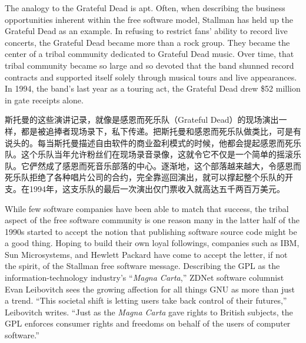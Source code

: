 \ifdefined\eng
The analogy to the Grateful Dead is apt. Often, when describing the business opportunities inherent within the free software model, Stallman has held up the Grateful Dead as an example. In refusing to restrict fans' ability to record live concerts, the Grateful Dead became more than a rock group. They became the center of a tribal community dedicated to Grateful Dead music. Over time, that tribal community became so large and so devoted that the band shunned record contracts and supported itself solely through musical tours and live appearances. In 1994, the band's last year as a touring act, the Grateful Dead drew \$52 million in gate receipts alone.
\fi

\ifdefined\chs
斯托曼的这些演讲记录，就像是感恩而死乐队（Grateful Dead）的现场演出一样，都是被追捧者现场录下，私下传递。把斯托曼和感恩而死乐队做类比，可是有说头的。每当斯托曼描述自由软件的商业盈利模式的时候，他都会提起感恩而死乐队。这个乐队当年允许粉丝们在现场录音录像，这就令它不仅是一个简单的摇滚乐队。它俨然成了感恩而死音乐部落的中心。逐渐地，这个部落越来越大，令感恩而死乐队拒绝了各种唱片公司的合约，完全靠巡回演出，就可以撑起整个乐队的开支。在1994年，这支乐队的最后一次演出仅门票收入就高达五千两百万美元。
\fi

\ifdefined\eng
While few software companies have been able to match that success, the tribal aspect of the free software community is one reason many in the latter half of the 1990s started to accept the notion that publishing software source code might be a good thing. Hoping to build their own loyal followings, companies such as IBM, Sun Microsystems, and Hewlett Packard have come to accept the letter, if not the spirit, of the Stallman free software message. Describing the GPL as the information-technology industry's ``\textit{Magna Carta},'' ZDNet software columnist Evan Leibovitch sees the growing affection for all things GNU as more than just a trend. ``This societal shift is letting users take back control of their futures,'' Leibovitch writes. ``Just as the \textit{Magna Carta} gave rights to British subjects, the GPL enforces consumer rights and freedoms on behalf of the users of computer software.''
\fi

